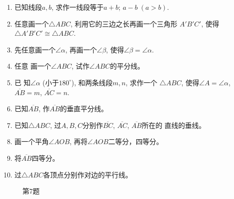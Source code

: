 \begin{example}
    
\end{example}
\begin{solution}
    
\end{solution}


\begin{example}
    
\end{example}


\begin{solution}
    
\end{solution}

\begin{ex}
\begin{enumerate}
	\item 已知线段$a,b$, 求作一线段等于$a+b$; $a-b\; (a>b)$.
	\item 任意画一个$\triangle ABC$, 利用它的三边之长再画一个三角形
$A'B'C'$, 使得$\triangle A'B'C'\cong \triangle ABC$.
	\item 先任意画一个$\angle \alpha$, 再画一个$\angle \beta$, 使得$\angle \beta=\angle\alpha$.
	\item 任意
	画一个$\angle ABC$, 试作$\angle ABC$的平分线。
	\item 已
	知$\angle \alpha$ (小于$180^{\circ}$), 和两条线段$m,n$, 求作一个
	$\triangle 
	ABC$, 使得$\angle A=\angle \alpha$, $\overline{AB}=m$, $\overline{AC}=n$.
	\item 已知$\overline{AB}$, 作$\overline{AB}$的垂直平分线。
	\item 已知$\triangle ABC$, 过$A,B,C$分别作$\overline{BC}$, $\overline{AC}$, $\overline{AB}$所在的
	直线的垂线。
	\item 画一个平角$\angle AOB$, 再将$\angle AOB$二等分，四等分。
	\item 将$\overline{AB}$四等分。
	\item 过$\triangle ABC$各顶点分别作对边的平行线。
\end{enumerate}
\end{ex}

\begin{figure}[htp]
	\centering
{}
	\caption*{第7题}
\end{figure}

